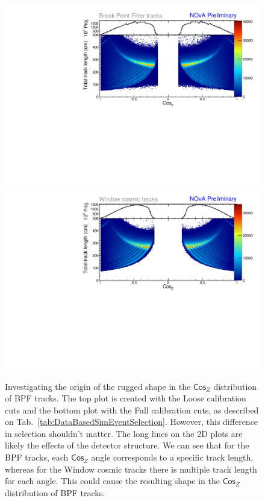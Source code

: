 \begin{enumerate}
\begin{enumerate}
\begin{figure}[!ht]
\includegraphics[width=\textwidth]{Plots/TBCalibration/DBSim_BPFPeaks_BPFTracks_dcosz_TotLength.pdf}
\includegraphics[width=\textwidth]{Plots/TBCalibration/DBSim_BPFPeaks_WTTracks_dcosz_TotLength.pdf}
\caption[Tracking algorithms $\textsf{Cos}_Z$ distributions for the data-based simulation selection]{Investigating the origin of the rugged shape in the $\textsf{Cos}_Z$ distribution of \acrshort{BPF} tracks. The top plot is created with the Loose calibration cuts and the bottom plot with the Full calibration cuts, as described on Tab.~\ref{tab:DataBasedSimEventSelection}. However, this difference in selection shouldn't matter. The long lines on the 2D plots are likely the effects of the detector structure. We can see that for the \acrshort{BPF} tracks, each $\textsf{Cos}_Z$ angle corresponds to a specific track length, whereas for the Window cosmic tracks there is multiple track length for each angle. This could cause the resulting shape in the $\textsf{Cos}_Z$ distribution of \acrshort{BPF} tracks.}
\label{fig:DataBasedSimBPFPeaks}
\end{figure}


\end{enumerate}
\end{enumerate}
